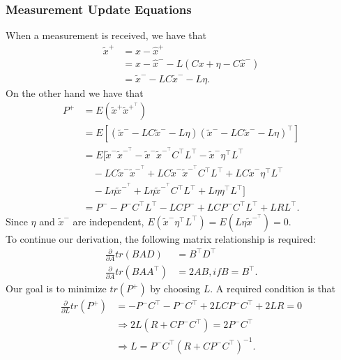 \subsubsection{Measurement Update Equations}
When a measurement is received, we have that
\begin{align*}
\tilde{x}^+&= x-\hat{x}^+\\
		   &= x-\hat{x}^- -L(Cx+\eta-C\hat{x}^-)\\
		   &= \tilde{x}^- -LC\tilde{x}^- -L\eta.
\end{align*}
On the other hand we have that
\begin{align} \label{eq:P_posteriori}
P^+ &= E(\tilde{x}^+\tilde{x}^{+^\top}) \nonumber\\
	&= E[(\tilde{x}^- -LC\tilde{x}^- -L\eta)(\tilde{x}^- -LC\tilde{x}^- -L\eta)^\top] \nonumber\\
	&= E[\tilde{x}^-\tilde{x}^{-^\top}-\tilde{x}^-\tilde{x}^{-^\top}C^\top L^\top-\tilde{x}^-\eta^\top L^\top \nonumber\\
	& \quad  -LC\tilde{x}^-\tilde{x}^{-^\top}+LC\tilde{x}^-\tilde{x}^{-^\top}C^\top L^\top+LC\tilde{x}^-\eta^\top L^\top \nonumber\\
	& \quad  -L\eta\tilde{x}^{-^\top}+L\eta\tilde{x}^{-^\top}C^\top L^\top+L\eta\eta^\top L^\top] \nonumber\\
	&= P^- -P^-C^\top L^\top-LCP^-+LCP^-C^\top L^\top+LRL^\top.
\end{align}
Since \begin{math} \eta  \end{math} and \begin{math} \tilde{x}^-  \end{math} are independent, \begin{math} E(\tilde{x}^-\eta^\top L^\top)=E(L\eta\tilde{x}^{-^\top})=0  \end{math}. \\
To continue our derivation, the following matrix relationship is required:
\begin{align*}
\frac{\partial}{\partial A}tr(BAD)&=B^\top D^\top \\
\frac{\partial}{\partial A}tr(BAA^\top)&=2AB, if B = B^\top.
\end{align*}
Our goal is to minimize \begin{math} tr(P^+)  \end{math} by choosing \begin{math} L  \end{math}. A required condition is that
\begin{align*}
\frac{\partial}{\partial L}tr(P^+)&=-P^-C^\top -P^-C^\top + 2LCP^-C^\top +2LR=0\\
&\Rightarrow 2L(R+CP^-C^\top)=2P^-C^\top \\
&\Rightarrow L = P^-C^\top (R+CP^-C^\top)^{-1}.
\end{align*}
